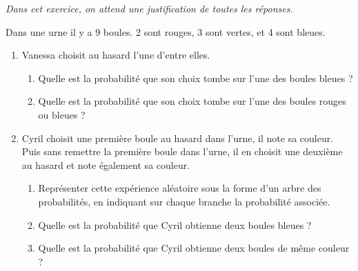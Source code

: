 \begin{minipage}{0.99\linewidth}


\exo

\emph{Dans cet exercice, on attend une justification de toutes les réponses.}\par 

Dans une urne il y a 9 boules. 2 sont rouges, 3 sont vertes, et 4 sont bleues.\\

\begin{enumerate}
\item Vanessa choisit au hasard l'une d'entre elles.\\
\begin{enumerate}
\item Quelle est la probabilité que son choix tombe sur l'une des boules bleues ?\\
\item Quelle est la probabilité que son choix tombe sur l'une des boules rouges ou bleues ?\\
\end{enumerate}

\item Cyril choisit une première boule au hasard dans l'urne, il note sa couleur. Puis sans remettre la première boule dans l'urne, il en choisit une deuxième au hasard et note également sa couleur.

\begin{enumerate}
\item Représenter cette expérience aléatoire sous la forme d'un arbre des probabilités, en indiquant sur chaque branche la probabilité associée.

\item Quelle est la probabilité que Cyril obtienne deux boules bleues ?

\item Quelle est la probabilité que Cyril obtienne deux boules de même couleur ?

\end{enumerate}

\end{enumerate}

\end{minipage}

\vspace{0.5cm}
